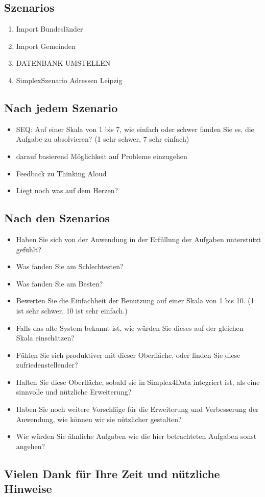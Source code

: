 \subsection*{Szenarios}
\begin{enumerate}
  \item Import Bundesländer
  \item Import Gemeinden
  \item[] DATENBANK UMSTELLEN
  \item SimplexSzenario Adressen Leipzig
\end{enumerate}

\subsection*{Nach jedem Szenario}
\begin{itemize}
  \item SEQ: Auf einer Skala von 1 bis 7, wie einfach oder schwer fanden Sie es, die Aufgabe zu absolvieren? (1 sehr schwer, 7 sehr einfach)
  \item darauf basierend Möglichkeit auf Probleme einzugehen
  \item Feedback zu Thinking Aloud
  \item Liegt noch was auf dem Herzen?
\end{itemize}

\subsection*{Nach den Szenarios}
\begin{itemize}
  \item Haben Sie sich von der Anwendung in der Erfüllung der Aufgaben unterstützt gefühlt?
  \item Was fanden Sie am Schlechtesten?
  \item Was fanden Sie am Besten?
  \item Bewerten Sie die Einfachheit der Benutzung auf einer Skala von 1 bis 10. (1 ist sehr schwer, 10 ist sehr einfach.)
  \item Falls das alte System bekannt ist, wie würden Sie dieses auf der gleichen Skala einschätzen?
  \item Fühlen Sie sich produktiver mit dieser Oberfläche, oder finden Sie diese zufriedenstellender?
  \item Halten Sie diese Oberfläche, sobald sie in Simplex4Data integriert ist, als eine sinnvolle und nützliche Erweiterung?
  \item Haben Sie noch weitere Vorschläge für die Erweiterung und Verbesserung der Anwendung, wie können wir sie nützlicher gestalten?
  \item Wie würden Sie ähnliche Aufgaben wie die hier betrachteten Aufgaben sonst angehen?
\end{itemize}

\subsection*{Vielen Dank für Ihre Zeit und nützliche Hinweise}
